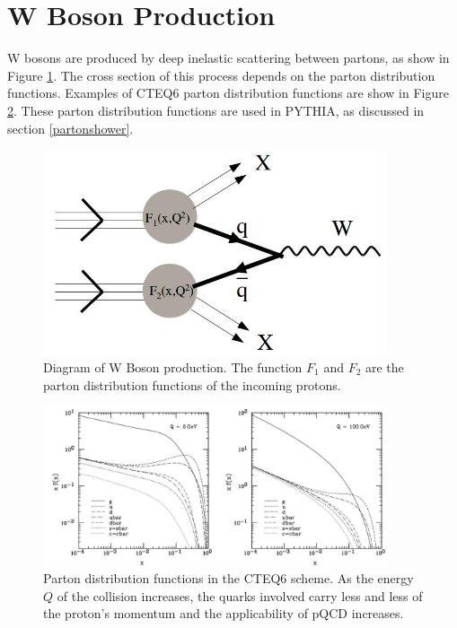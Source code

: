 \documentclass[oneside, letterpaper, oldfontcommands]{memoir}
\begin{document}
\section{W Boson Production}\label{wboson}
\qquad W bosons are produced by deep inelastic scattering between partons, as show in Figure \ref{fig:WFormation}. The cross section of this process depends on the parton distribution functions. Examples of CTEQ6 parton distribution functions are show in Figure \ref{fig:cteq6PDF}\cite{Pumplin:2002vw}. These parton distribution functions are used in PYTHIA, as discussed in section \ref{partonshower}.

\begin{figure}[here]
\includegraphics[width=0.9\textwidth]{WFormation.jpg}
\caption{Diagram of W Boson production. The function $F_{1}$ and $F_{2}$ are the parton distribution functions of the incoming protons.}
\label{fig:WFormation}
\end{figure}

\begin{figure}[here]
\includegraphics[width=0.9\textwidth]{cteq6PDF.jpg}
\caption{Parton distribution functions in the CTEQ6 scheme\cite{Pumplin:2002vw}. As the energy $Q$ of the collision increases, the quarks involved carry less and less of the proton's momentum and the applicability of pQCD increases.}
\label{fig:cteq6PDF}
\end{figure}
\end{document}
